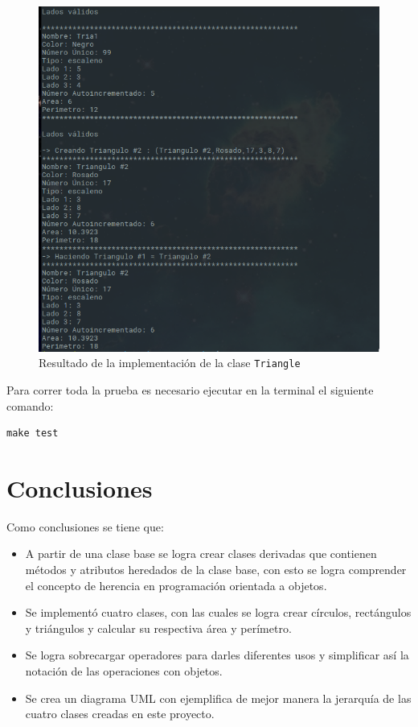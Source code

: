 \begin{figure}[H]
\centering
\includegraphics[width=.7\textwidth]{imgs/Labo3/TRI2}
\caption{Resultado de la implementación de la clase \texttt{Triangle}}
\label{fig:TRI2}
\end{figure}

Para correr toda la prueba es necesario ejecutar en la terminal el siguiente comando:

\begin{verbatim}
make test
\end{verbatim}

\newpage
\section{Conclusiones}
 Como conclusiones se tiene que:
 
\begin{itemize}
\item A partir de una clase base se logra crear clases derivadas que contienen métodos y atributos heredados de la clase base, con esto se logra comprender el concepto de herencia en programación orientada a objetos.
\item Se implementó cuatro clases, con las cuales se logra crear círculos, rectángulos y triángulos y calcular su respectiva área y perímetro. 
\item Se logra sobrecargar operadores para darles diferentes usos y simplificar así la notación de las operaciones con objetos.
\item Se crea un diagrama UML con ejemplifica de mejor manera la jerarquía de las cuatro clases creadas en este proyecto.
\end{itemize}
